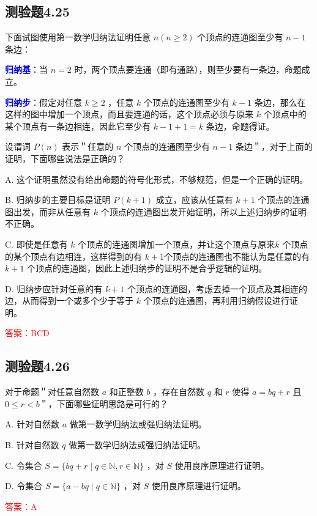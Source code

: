 \documentclass[UTF8, heading=true]{ctexart}
\begin{document}
\subsection{测验题4.25}

下面试图使用第一数学归纳法证明任意 $n(n \geq 2)$ 个顶点的连通图至少有 $n-1$ 条边：

\textcolor{blue}{\textbf{归纳基}}：当 $n=2$ 时，两个顶点要连通（即有通路），则至少要有一条边，命题成立。

\textcolor{blue}{\textbf{归纳步}}：假定对任意 $k \geq 2$ ，任意 $k$ 个顶点的连通图至少有 $k-1$ 条边，那么在这样的图中增加一个顶点，而且要连通的话，这个顶点必须与原来 $k$ 个顶点中的某个顶点有一条边相连，因此它至少有 $k-1+1=k$ 条边，命题得证。

设谓词 $P(n)$ 表示＂任意的 $n$ 个顶点的连通图至少有 $n-1$ 条边＂，对于上面的证明，下面哪些说法是正确的？

A. 这个证明虽然没有给出命题的符号化形式，不够规范，但是一个正确的证明。

B. 
归纳步的主要目标是证明 $P(k+1)$ 成立，应该从任意有 $k+1$ 个顶点的连通图出发，而非从任意有 $k$ 个顶点的连通图出发开始证明，所以上述归纳步的证明不正确。

C. 
即使是任意有 $k$ 个顶点的连通图增加一个顶点，并让这个顶点与原来$k$ 个顶点的某个顶点有边相连，这样得到的有 $k+1$个顶点的连通图也不能认为是任意的有 $k+1$ 个顶点的连通图，因此上述归纳步的证明不是合乎逻辑的证明。

D. 
归纳步应针对任意的有 $k+1$ 个顶点的连通图，考虑去掉一个顶点及其相连的边，从而得到一个或多个少于等于 $k$ 个顶点的连通图，再利用归纳假设进行证明。


\textcolor{red}{答案：BCD}

\subsection{测验题4.26}

对于命题＂对任意自然数 $a$ 和正整数 $b$ ，存在自然数 $q$ 和 $r$ 使得 $a=b q+r$ 且 $0 \leq r<b$＂，下面哪些证明思路是可行的？

A. 针对自然数 $a$ 做第一数学归纳法或强归纳法证明。

B. 针对自然数 $q$ 做第一数学归纳法或强归纳法证明。

C. 令集合 $S=\{b q+r \mid q \in \mathbb{N}, r \in \mathbb{N}\}$ ，对 $S$ 使用良序原理进行证明。

D. 令集合 $S=\{a-b q \mid q \in \mathbb{N}\}$ ，对 $S$ 使用良序原理进行证明。


\textcolor{red}{答案：A}
\end{document}
